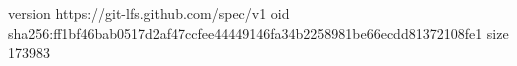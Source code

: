 version https://git-lfs.github.com/spec/v1
oid sha256:ff1bf46bab0517d2af47ccfee44449146fa34b2258981be66ecdd81372108fe1
size 173983
